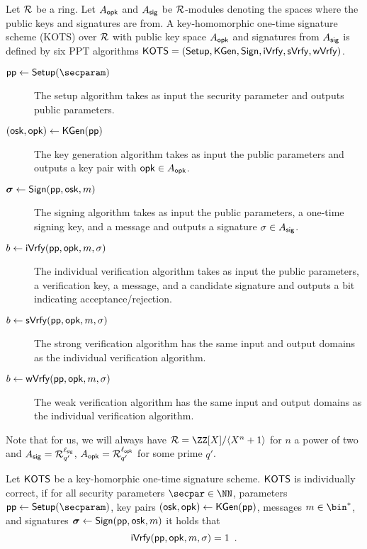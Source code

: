 \begin{definition}\label{def:hots}
  Let $\mathcal{R}$ be a ring. Let $A_{\mathsf{opk}}$ and $A_{\mathsf{sig}}$ be $\mathcal{R}$-modules denoting the spaces where the public keys and signatures are from.
  A key-homomorphic one-time signature scheme (KOTS) over $\mathcal{R}$ with public key space $A_{\mathsf{opk}}$ and signatures from $A_{\mathsf{sig}}$
  is defined by six PPT algorithms $\mathsf{KOTS}=(\mathsf{Setup},\mathsf{KGen},\mathsf{Sign},\mathsf{iVrfy}, \mathsf{sVrfy}, \mathsf{wVrfy})$.
  \begin{description}
    \item[$\params\gets\setup(\secparam)$] The setup algorithm takes as input the security parameter and outputs public parameters.
    \item[$(\mathsf{osk},\mathsf{opk}) \gets \mathsf{KGen}(\mathsf{pp})$] The key generation algorithm takes as input the public parameters and outputs a key pair with $\mathsf{opk}\in A_{\mathsf{opk}}$.
    \item[$\boldsymbol{\sigma} \gets \mathsf{Sign}(\mathsf{pp},\mathsf{osk},m)$] The signing algorithm takes as input the public parameters, a one-time signing key, and a message and outputs a signature $\sigma\in A_{\mathsf{sig}}$.
    \item[$b\gets \mathsf{iVrfy}(\mathsf{pp},\mathsf{opk},m,\sigma)$] The individual verification algorithm takes as input the public parameters, a verification key, a message, and a candidate signature and outputs a bit indicating acceptance/rejection.
    \item[$b\gets \mathsf{sVrfy}(\mathsf{pp},\mathsf{opk},m,\sigma)$] The strong verification algorithm has the same input and output domains as the individual verification algorithm.
    \item[$b\gets \mathsf{wVrfy}(\mathsf{pp},\mathsf{opk},m,\sigma)$] The weak verification algorithm has the same input and output domains as the individual verification algorithm.
  \end{description}
\end{definition}
Note that for us, we will always have $\ring = \ZZ[X]/\langle X^n+1\rangle$ for $n$ a power of two and $A_{\mathsf{sig}} = \mathcal{R}_{q'}^{\ell_{\mathsf{sig}}}$, $A_{\mathsf{opk}} = \mathcal{R}_{q'}^{\ell_{\mathsf{opk}}}$ for some prime $q'$.

\begin{definition}
Let $\mathsf{KOTS}$ be a key-homorphic one-time signature scheme.
$\mathsf{KOTS}$ is individually correct, if for all security parameters $\secpar\in\NN$, parameters $\params \gets \setup(\secparam)$, key pairs $(\mathsf{osk},\mathsf{opk}) \gets \mathsf{KGen}(\mathsf{pp})$, messages $m\in\bin^*$, and signatures $\boldsymbol{\sigma} \gets \mathsf{Sign}(\mathsf{pp},\mathsf{osk},m)$ it holds that
\[
  \mathsf{iVrfy}(\mathsf{pp},\mathsf{opk},m,\sigma)=1\enspace.
\]
\end{definition}

